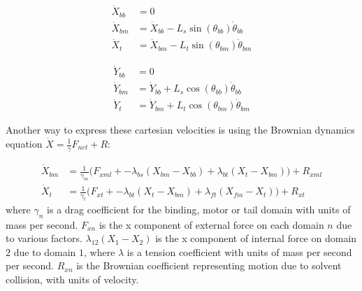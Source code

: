 \documentclass[
11pt, %
english, %
singlespacing, %
headsepline, %
chapterinoneline, %
]{MastersDoctoralThesis} %
\begin{document}
\noindent\begin{minipage}{0.49\linewidth}
\begin{align}
  \dot{X}_{bb} &= 0 \\
  \dot{X}_{bm} &= \dot{X}_{bb} - L_{s}\sin(\theta_{bb})\dot{\theta}_{bb} \label{cartesian-bmx}\\
  \dot{X}_{t } &= \dot{X}_{bm} - L_{t}\sin(\theta_{bm})\dot{\theta}_{bm}
\end{align}
\end{minipage}
\begin{minipage}{0.49\linewidth}
\begin{align}                                                                          
  \dot{Y}_{bb} &= 0 \\                                                        
  \dot{Y}_{bm} &= \dot{Y}_{bb} + L_{s}\cos(\theta_{bb})\dot{\theta}_{bb} \\
  \dot{Y}_{t}  &= \dot{Y}_{bm} + L_{t}\cos(\theta_{bm})\dot{\theta}_{bm}
\end{align}
\end{minipage}
\vspace{.5cm}
%
Another way to express these cartesian velocities is using the Brownian dynamics equation $\dot{X} = \frac1\gamma F_{net} + R$:

\begin{align}  
  \dot{X}_{bm} &= \frac{1}{\gamma_m} \Big(F_{xml} + - \lambda_{bs}(X_{bm} - X_{bb}) + \lambda_{bt}(X_{t } - X_{bm}) \Big) + R_{xml} \label{brownian-bmx}\\
  \dot{X}_{t } &= \frac{1}{\gamma_t} \Big(F_{xt } + - \lambda_{bt}(X_{t } - X_{bm}) + \lambda_{ft}(X_{fm} - X_{t }) \Big) + R_{xt }
\end{align}
%
where $\gamma_n$ is a drag coefficient for the binding, motor or tail domain with units of mass per second. $F_{xn}$ is the x component of external force on each domain $n$ due to various factors. $\lambda_{12}\left(X_1 - X_2\right)$ is the x component of internal force on domain $2$ due to domain $1$, where $\lambda$ is a tension coefficient with units of mass per second per second. $R_{xn}$ is the Brownian coefficient representing motion due to solvent collision, with units of velocity.\\
\end{document}
